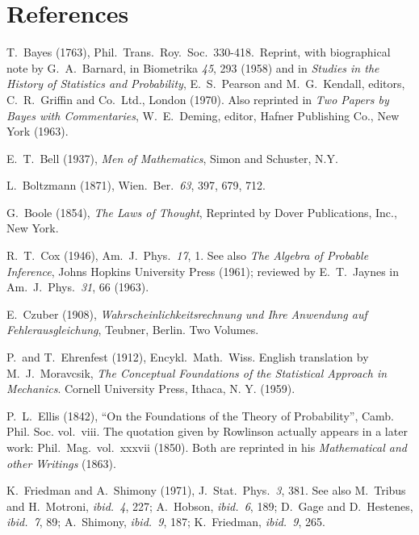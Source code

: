 \section*{References}

\begin{itemize}[label={}, leftmargin=*, itemsep={0.5\baselineskip plus 2pt}]
 T.~Bayes (1763), Phil.~Trans.~Roy.~Soc.~330-418.~Reprint, with biographical note by G.~A.~Barnard, in Biometrika \emph{45}, 293 (1958) and in \emph{Studies in the History of Statistics and Probability}, E.~S.~Pearson and M.~G.~Kendall, editors, C.~R.~Griffin and Co.~Ltd., London (1970). Also reprinted in \emph{Two Papers by Bayes with Commentaries}, W.~E.~Deming, editor, Hafner Publishing Co., New York (1963).

 E.~T.~Bell (1937), \emph{Men of Mathematics}, Simon and Schuster, N.Y.

 L.~Boltzmann (1871), Wien.~Ber.~\emph{63}, 397, 679, 712.

 G.~Boole (1854), \emph{The Laws of Thought}, Reprinted by Dover Publications, Inc., New York.

 R.~T.~Cox (1946), Am.~J.~Phys.~\emph{17}, 1. See also \emph{The Algebra of Probable Inference}, Johns Hopkins University Press (1961); reviewed by E.~T.~Jaynes in Am.~J.~Phys.~\emph{31}, 66 (1963).

 E.~Czuber (1908), \emph{Wahrscheinlichkeitsrechnung und Ihre Anwendung auf Fehlerausgleichung}, Teubner, Berlin. Two Volumes.

 P.~and T.~Ehrenfest (1912), Encykl.~Math.~Wiss. English translation by M.~J.~Moravcsik, \emph{The Conceptual Foundations of the Statistical Approach in Mechanics}. Cornell University Press, Ithaca, N. Y. (1959).

 P.~L.~Ellis (1842), ``On the Foundations of the Theory of Probability'', Camb. Phil. Soc. vol.~viii. The quotation given by Rowlinson actually appears in a later work: Phil.~Mag.~vol.~xxxvii (1850). Both are reprinted in his \emph{Mathematical and other Writings} (1863).

 K.~Friedman and A.~Shimony (1971), J.~Stat.~Phys.~\emph{3}, 381. See also M.~Tribus and H.~Motroni, \emph{ibid.~4}, 227; A.~Hobson, \emph{ibid.~6}, 189; D.~Gage and D.~Hestenes, \emph{ibid.~7}, 89; A.~Shimony, \emph{ibid.~9}, 187; K.~Friedman, \emph{ibid.~9}, 265.


\end{itemize}
